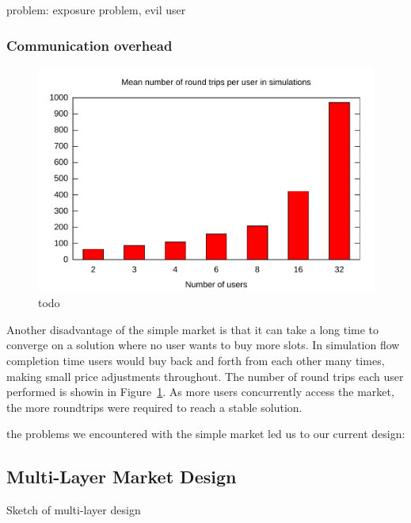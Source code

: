 problem: exposure problem, evil user

\subsubsection{Communication overhead}

\begin{figure}
\includegraphics[width=\columnwidth]{plots/num_roundtrips.pdf}
\caption{todo}
\label{f:num_roundtrips}
\end{figure}

Another disadvantage of the simple market is that it can take a long time to converge on a solution where no user wants to buy more slots. In simulation flow completion time users would buy back and forth from each other many times, making small price adjustments throughout. The number of round trips each user performed is showin in Figure~\ref{f:num_roundtrips}. As more users concurrently access the market, the more roundtrips were required to reach a stable solution.


the problems we encountered with the simple market led us to our current design:
\subsection{Multi-Layer Market Design}

Sketch of multi-layer design
